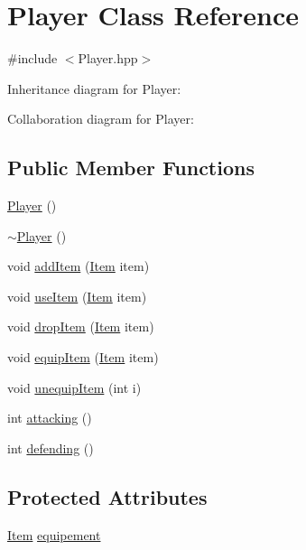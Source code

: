 \hypertarget{classPlayer}{\section{Player Class Reference}
\label{classPlayer}
}


{\ttfamily \#include $<$Player.\-hpp$>$}



Inheritance diagram for Player\-:


Collaboration diagram for Player\-:
\subsection*{Public Member Functions}
\begin{DoxyCompactItemize}
\item 
\hyperlink{classPlayer_affe0cc3cb714f6deb4e62f0c0d3f1fd8}{Player} ()
\item 
\hyperlink{classPlayer_a749d2c00e1fe0f5c2746f7505a58c062}{$\sim$\-Player} ()
\item 
void \hyperlink{classPlayer_af3cbcc88ce2ce938019801ec71218046}{add\-Item} (\hyperlink{classItem}{Item} item)
\item 
void \hyperlink{classPlayer_a6caf5c2ae76267968b6a06a225a00609}{use\-Item} (\hyperlink{classItem}{Item} item)
\item 
void \hyperlink{classPlayer_ad707a3214b63d3b4d2ac9fa438f68e9e}{drop\-Item} (\hyperlink{classItem}{Item} item)
\item 
void \hyperlink{classPlayer_a52bdaa2e5c935c35f482e5de4e6d7f02}{equip\-Item} (\hyperlink{classItem}{Item} item)
\item 
void \hyperlink{classPlayer_ad604c70fee591ae55fbda6ab965db757}{unequip\-Item} (int i)
\item 
int \hyperlink{classPlayer_a9394f4587fc0a47113ada1696d77fdaa}{attacking} ()
\item 
int \hyperlink{classPlayer_aff7f08209821a79676bb7ac03d9f6d82}{defending} ()
\end{DoxyCompactItemize}
\subsection*{Protected Attributes}
\begin{DoxyCompactItemize}
\item 
\hyperlink{classItem}{Item} \hyperlink{classPlayer_ae34c7e3c96cb1b30b183e4e41f572a6e}{equipement}
\end{DoxyCompactItemize}


